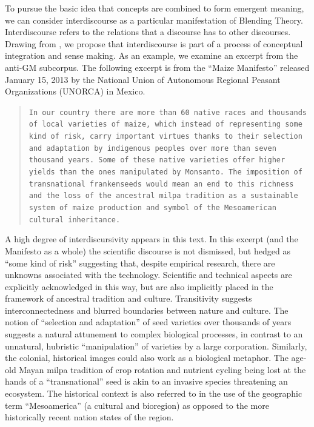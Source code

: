 To pursue the basic idea that concepts are combined to form emergent meaning, we can consider interdiscourse as a particular manifestation of Blending Theory. Interdiscourse refers to the relations that a discourse has to other discourses. Drawing from \citep{Bullo2017a}, we propose that interdiscourse is part of a process of conceptual integration and sense making. As an example, we examine an excerpt from the anti-GM subcorpus. The following excerpt is from the ``Maize Manifesto'' released January 15, 2013 by the National Union of Autonomous Regional Peasant Organizations (UNORCA) in Mexico.

\begin{footnotesize}
\begin{quote}
\texttt{\justify In our country there are more than 60 native races and thousands of local varieties of maize, which instead of representing some kind of risk, carry important virtues thanks to their selection and adaptation by indigenous peoples over more than seven thousand years. Some of these native varieties offer higher yields than the ones manipulated by Monsanto. The imposition of transnational frankenseeds would mean an end to this richness and the loss of the ancestral milpa tradition as a sustainable system of maize production and symbol of the Mesoamerican cultural inheritance.}
\end{quote}
\end{footnotesize}

A high degree of interdiscursivity appears in this text. In this excerpt (and the Manifesto as a whole) the scientific discourse is not dismissed, but hedged as ``some kind of risk'' suggesting that, despite empirical research, there are unknowns associated with the technology. Scientific and technical aspects are explicitly acknowledged in this way, but are also implicitly placed in the framework of ancestral tradition and culture. Transitivity suggests interconnectedness and blurred boundaries between nature and culture. The notion of ``selection and adaptation'' of seed varieties over thousands of years suggests a natural attunement to complex biological processes, in contrast to an unnatural, hubristic ``manipulation'' of varieties by a large corporation. Similarly, the colonial, historical images could also work as a biological metaphor. The age-old Mayan milpa tradition of crop rotation and nutrient cycling being lost at the hands of a ``transnational'' seed is akin to an invasive species threatening an ecosystem. The historical context is also referred to in the use of the geographic term ``Mesoamerica'' (a cultural and bioregion) as opposed to the more historically recent nation states of the region. 

